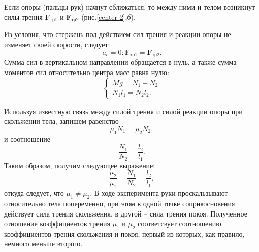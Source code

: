 \documentclass[14pt,a4paper,oneside]{extarticle}	%
\begin{document}
		Если опоры (пальцы рук) начнут сближаться, то между ними и телом возникнут силы трения $ \textbf{F}_{\text{тр}1} $ и $ \textbf{F}_{\text{тр}2} $ (рис.\ref{center-2},\textit{б}).
				
		Из условия, что стержень под действием сил трения и реакции опоры не изменяет своей скорости, следует:
		\begin{equation}
		a_c=0: \textbf{F}_{\text{тр}1} =\textbf{F}_{\text{тр}2}.
		\end{equation}	
		Сумма сил в вертикальном направлении обращается в нуль, а также сумма моментов сил относительно центра масс равна нулю:
		\begin{equation}
		\begin{cases}
		Mg = N_1 + N_2 \\
		N_1l_1 = N_2l_2.
		\end{cases}
		\end{equation}

Используя известную связь между силой трения и силой реакции опоры при скольжении тела, запишем равенство
\begin{equation}
\mu_1N_1 =\mu_2N_2,
\end{equation}
и соотношение
\begin{equation}
\dfrac{N_1}{N_2} =\dfrac{l_2}{l_1}.
\end{equation}
Таким образом, получим следующее выражение:
\begin{equation}
\dfrac{\mu_2}{\mu_1}=\dfrac{N_1}{N_2} =\dfrac{l_2}{l_1},
\end{equation}
откуда следует, что $ \mu_1 \neq \mu_2 $. В ходе эксперимента руки проскальзывают относительно тела попеременно, при этом в одной точке соприкосновения действует сила трения скольжения, в другой -- сила трения покоя. Полученное отношение коэффициентов трения $ \mu_1 $ и $ \mu_2 $ соответсвует соотношению коэффициентов трения скольжения и покоя, первый из которых, как правило, немного меньше второго.
\end{document}
